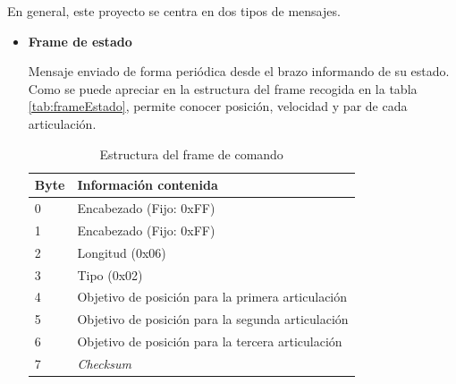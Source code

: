 En general, este proyecto se centra en dos tipos de mensajes.

\begin{itemize}
\item \textbf{Frame de estado}

Mensaje enviado de forma periódica desde el brazo informando de su estado. Como se puede apreciar en la estructura del frame recogida en la tabla \ref{tab:frameEstado}, permite conocer posición, velocidad y par de cada articulación.

\begin{table}[bth]
\begin{center}
\begin{tabular}{|m{15mm}|m{80mm}|}
\hline
\textbf{Byte} & \textbf{Información contenida}\\
\hline
0 & Encabezado (Fijo: 0xFF)\\
\hline
1 & Encabezado (Fijo: 0xFF)\\
\hline
2 & Longitud (0x06)\\
\hline
3 & Tipo (0x02)\\
\hline
4 & Objetivo de posición para la primera articulación\\
\hline
5 & Objetivo de posición para la segunda articulación\\
\hline
6 & Objetivo de posición para la tercera articulación\\
\hline
7 & \textit{Checksum}\\
\hline
\end{tabular}
\end{center}
\caption{Estructura del frame de comando\cite{Heredia1:2018}}
\label{tab:frameComando}
\end{table}


\end{itemize}
